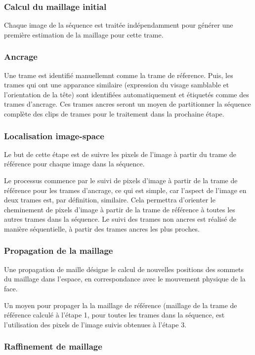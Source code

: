 \documentclass[a4paper,12pt]{article}
\begin{document}
\subsubsection*{Calcul du maillage initial}
Chaque image de la séquence est traitée indépendamment pour générer
une première estimation de la maillage pour cette trame. 

\subsubsection*{Ancrage}
Une trame est identifié manuellemnt comme la trame de réference. Puis,
les trames qui ont une apparance similaire (expression du visage
samblable et l'orientation de la tête) sont identifiées
automatiquement et étiquetés comme des trames d'ancrage. Ces trames
ancres seront un moyen de partitionner la séquence complète des clips
de trames pour le traitement dans la prochaine étape. 

\subsubsection*{Localisation image-space}
Le but de cette étape est de suivre les pixels de l'image à partir du
trame de référence pour chaque image dans la séquence.  

Le processus commence par le suivi de pixels d'image à partir de la
trame de référence pour les trames d'ancrage, ce qui est simple, car
l'aspect de l'image en deux trames est, par définition,
similaire. Cela permettra d'orienter le cheminement de pixels d'image
à partir de la trame de référence à toutes les autres trames dans la
séquence.  
Le suivi des trames non ancres est réalisé de manière séquentielle, à
partir des trames ancres les plus proches.

\subsubsection*{Propagation de la maillage}

Une propagation de maille désigne le calcul de nouvelles positions des
sommets du maillage dans l'espace, en correspondance avec le mouvement
physique de la face.

Un moyen pour propager la la maillage de référence (maillage de la
trame de référence calculé à l'étape 1, pour toutes les trames dans
la séquence, est l'utilisation des pixels de l'image suivis obtenues à
l'étape 3.
 
\subsubsection*{Raffinement de maillage}
\end{document}
